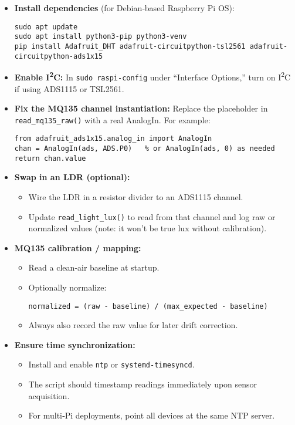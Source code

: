 \documentclass[11pt]{article}
\begin{document}
\begin{itemize}
  \item \textbf{Install dependencies} (for Debian‐based Raspberry Pi OS):  
    \begin{verbatim}
sudo apt update
sudo apt install python3-pip python3-venv
pip install Adafruit_DHT adafruit-circuitpython-tsl2561 adafruit-circuitpython-ads1x15
    \end{verbatim}

  \item \textbf{Enable I\textsuperscript{2}C:}  
    In \texttt{sudo raspi-config} under “Interface Options,” turn on I\textsuperscript{2}C if using ADS1115 or TSL2561.

  \item \textbf{Fix the MQ135 channel instantiation:}  
    Replace the placeholder in \texttt{read\_mq135\_raw()} with a real AnalogIn. For example:
    \begin{verbatim}
from adafruit_ads1x15.analog_in import AnalogIn
chan = AnalogIn(ads, ADS.P0)   % or AnalogIn(ads, 0) as needed
return chan.value
    \end{verbatim}

  \item \textbf{Swap in an LDR (optional):}  
    \begin{itemize}
      \item Wire the LDR in a resistor divider to an ADS1115 channel.  
      \item Update \texttt{read\_light\_lux()} to read from that channel and log raw or normalized values (note: it won’t be true lux without calibration).
    \end{itemize}

  \item \textbf{MQ135 calibration / mapping:}
    \begin{itemize}
      \item Read a clean‐air baseline at startup.  
      \item Optionally normalize:  
        \begin{verbatim}
normalized = (raw - baseline) / (max_expected - baseline)
        \end{verbatim}
      \item Always also record the raw value for later drift correction.
    \end{itemize}

  \item \textbf{Ensure time synchronization:}
    \begin{itemize}
      \item Install and enable \texttt{ntp} or \texttt{systemd-timesyncd}.  
      \item The script should timestamp readings immediately upon sensor acquisition.  
      \item For multi‐Pi deployments, point all devices at the same NTP server.
    \end{itemize}


\end{itemize}
\end{document}
